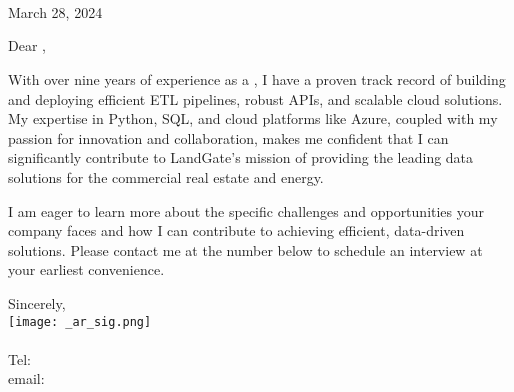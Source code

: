 \documentclass[letterpaper]{article}
\begin{document}
\large
\JobManager \\
\JobManagerTitle \\
\textbf{\JobCompany} \\

\null\hfill March 28, 2024


Dear \JobManagerShort,

With over nine years of experience as a \JobTitle, I have a proven track
record of building and deploying efficient ETL pipelines, robust APIs, and
scalable cloud solutions.
My expertise in Python, SQL, and cloud
platforms like Azure, coupled with my passion for innovation and collaboration,
makes me confident that I can significantly contribute to LandGate's mission of
providing the leading data solutions for the commercial real estate and energy.

I am eager to learn more about the specific challenges and opportunities your company faces and how
I can contribute to achieving efficient, data-driven solutions.
Please contact me at the number below to schedule an interview at your earliest convenience.


Sincerely,\\
    \hspace{1em}
    \texttt{[image: \_ar\_sig.png]} \\
    \CVsigname \\
    \small
    Tel: \CVphone \\
    email: \CVemail
\end{document}
